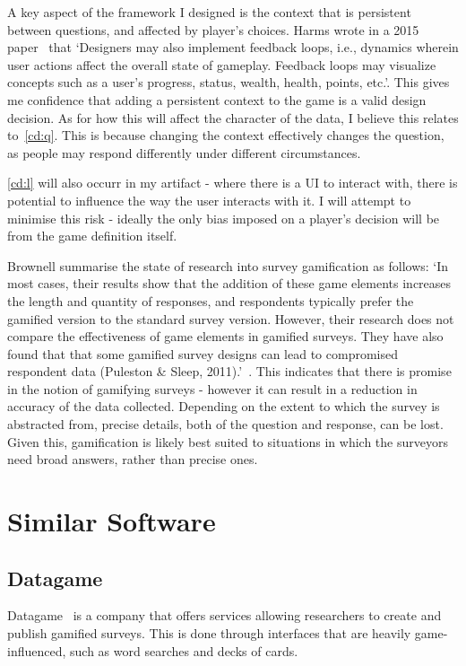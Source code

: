 A key aspect of the framework I designed is the context that is persistent between questions, and affected by player's choices. Harms \etal wrote in a 2015 paper~\cite{Olympic} that `Designers may also implement feedback loops, i.e., dynamics wherein user actions affect the overall state of gameplay. Feedback loops may visualize concepts such as a user’s progress, status, wealth, health, points, etc.'. 
This gives me confidence that adding a persistent context to the game is a valid design decision.
As for how this will affect the character of the data, I believe this relates to~\ref{cd:q}. 
This is because changing the context effectively changes the question, as people may respond differently under different circumstances. 

\ref{cd:l} will also occurr in my artifact - where there is a UI to interact with, there is potential to influence the way the user interacts with it. I will attempt to minimise this risk - ideally the only bias imposed on a player's decision will be from the game definition itself.

Brownell \etal \cite{SurveyGamificationResearch} summarise the state of research into survey gamification as follows:
`In most cases, their results show that the addition of these game elements increases the length and quantity of responses, and respondents typically prefer the gamified version to the standard survey version. However, their research does not compare the effectiveness of game elements in gamified surveys. They have also found that that some gamified survey designs can lead to compromised respondent data (Puleston \& Sleep, 2011).'~\cite{SurveyGamificationResearch}.
This indicates that there is promise in the notion of gamifying surveys - however it can result in a reduction in accuracy of the data collected. Depending on the extent to which the survey is abstracted from, precise details, both of the question and response, can be lost. Given this, gamification is likely best suited to situations in which the surveyors need broad answers, rather than precise ones.

\section{Similar Software}\label{soft}

\subsection{Datagame}
Datagame~\cite{Datagame} is a company that offers services allowing researchers to create and publish gamified surveys. This is done through interfaces that are heavily game-influenced, such as word searches and decks of cards.

